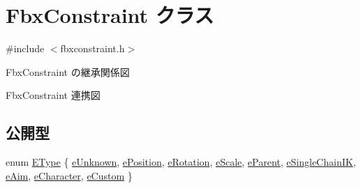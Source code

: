 \hypertarget{class_fbx_constraint}{}\section{Fbx\+Constraint クラス}
\label{class_fbx_constraint}


{\ttfamily \#include $<$fbxconstraint.\+h$>$}



Fbx\+Constraint の継承関係図


Fbx\+Constraint 連携図
\subsection*{公開型}
\begin{DoxyCompactItemize}
\item 
enum \hyperlink{class_fbx_constraint_a49c1634663395eab7c28856df233ec66}{E\+Type} \{ \newline
\hyperlink{class_fbx_constraint_a49c1634663395eab7c28856df233ec66a1f5c6c9045cb37f8e33ab54d41b628f2}{e\+Unknown}, 
\hyperlink{class_fbx_constraint_a49c1634663395eab7c28856df233ec66a1be363288f8d920cf30cffaa7cdef010}{e\+Position}, 
\hyperlink{class_fbx_constraint_a49c1634663395eab7c28856df233ec66a99a284f64e965cb86f9a3550a99b3160}{e\+Rotation}, 
\hyperlink{class_fbx_constraint_a49c1634663395eab7c28856df233ec66a64de25b844a25f3723f7cb0dbaa4f27a}{e\+Scale}, 
\newline
\hyperlink{class_fbx_constraint_a49c1634663395eab7c28856df233ec66a243a8e5ff104cc018d76fd60d82ad5ef}{e\+Parent}, 
\hyperlink{class_fbx_constraint_a49c1634663395eab7c28856df233ec66a849661b75a2235ba1b244bc8ee8d9509}{e\+Single\+Chain\+IK}, 
\hyperlink{class_fbx_constraint_a49c1634663395eab7c28856df233ec66a6d6fcad832cbbab74f171c5b6fa46ba1}{e\+Aim}, 
\hyperlink{class_fbx_constraint_a49c1634663395eab7c28856df233ec66ad04946a8d6506e255a01521277db52f0}{e\+Character}, 
\newline
\hyperlink{class_fbx_constraint_a49c1634663395eab7c28856df233ec66ab7e7b731132836a4bb94b9be642cd861}{e\+Custom}
 \}
\end{DoxyCompactItemize}
